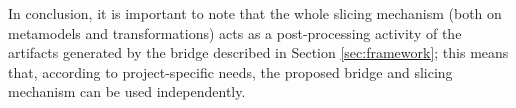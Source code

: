 In conclusion, it is important to note that the whole slicing mechanism (both on metamodels and transformations)
acts as a post-processing activity of the artifacts generated by the bridge described in Section \ref{sec:framework}; this means that, according to project-specific needs, the proposed bridge and slicing mechanism can be used independently.

